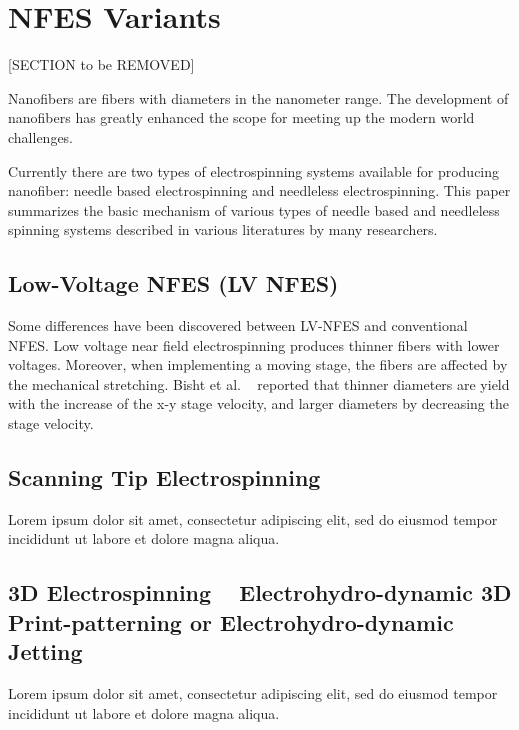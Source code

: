 \documentclass[5p,,preprint,12pt,twocolumn]{elsarticle}
\begin{document}
\section{NFES Variants}
[SECTION to be REMOVED]

Nanofibers are fibers with diameters in the nanometer range. The development of nanofibers has greatly enhanced the scope for meeting up the modern world challenges. 

Currently there are two types of electrospinning systems available for producing nanofiber: needle based electrospinning and needleless electrospinning. This paper summarizes the basic mechanism of various types of needle based and needleless spinning systems described in various literatures by many researchers.



\subsection{Low-Voltage NFES (LV NFES) \unskip~\protect\cite{527120:11973130}}Some differences have been discovered between LV-NFES and conventional NFES. Low voltage near field electrospinning produces thinner fibers with lower voltages. Moreover, when implementing a moving stage, the fibers are affected by the mechanical stretching. Bisht et al. \unskip~\cite{527120:11973130} reported that thinner diameters are yield with the increase of the x-y stage velocity, and larger diameters by decreasing the stage velocity.



\subsection{Scanning Tip Electrospinning \unskip~\protect\cite{527120:11974306}}Lorem ipsum dolor sit amet, consectetur adipiscing elit, sed do eiusmod tempor incididunt ut labore et dolore magna aliqua.



\subsection{3D Electrospinning \unskip~\protect\cite{527120:11974313} \mbox{}\protect\newline Electrohydro-dynamic 3D Print-patterning or Electrohydro-dynamic Jetting \unskip~\protect\cite{527120:11974310}}Lorem ipsum dolor sit amet, consectetur adipiscing elit, sed do eiusmod tempor incididunt ut labore et dolore magna aliqua.
\end{document}
